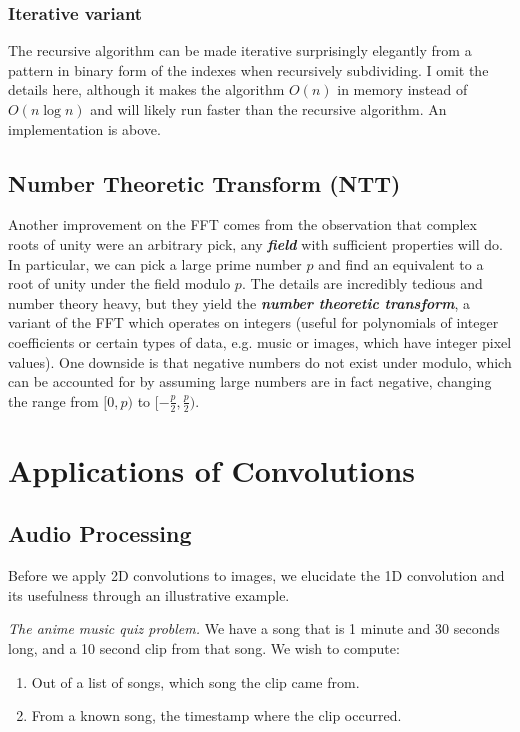 \documentclass[11pt, oneside]{article}
\newcommand{\emphasis}[1]{\textbf{\textit{#1}}}
\theoremstyle{plain}
\theoremstyle{definition}
\begin{document}
\subsubsection{Iterative variant}
The recursive algorithm can be made iterative surprisingly elegantly from a
pattern in binary form of the indexes when recursively subdividing.
I omit the details here, although it makes the algorithm \( O(n) \) in memory
instead of \( O(n \log n) \) and will likely run faster than the recursive 
algorithm. An implementation is above.

\subsection{Number Theoretic Transform (NTT)}
Another improvement on the FFT comes from the observation that complex
roots of unity were an arbitrary pick, any \emphasis{field} with sufficient
properties will do. In particular, we can pick a large prime number \( p \) 
and find an equivalent to a root of unity under the field modulo \( p \).
The details are incredibly tedious and number theory heavy, but they yield
the \emphasis{number theoretic transform}, a variant of the FFT which operates
on integers (useful for polynomials of integer coefficients or certain types of
data, e.g. music or images, which have integer pixel values).
One downside is that negative numbers do not exist under modulo, which can
be accounted for by assuming large numbers are in fact negative,
changing the range from \( [0, p) \) to \( [-\frac{p}{2}, \frac{p}{2}) \).

\section{Applications of Convolutions}
\subsection{Audio Processing}
Before we apply 2D convolutions to images, we elucidate the 1D convolution
and its usefulness through an illustrative example.
\begin{displayquote}
\textit{The anime music quiz problem.} We have a song that is 1 minute and
30 seconds long, and a 10 second clip from that song. We wish to compute:
\begin{enumerate}
  \item Out of a list of songs, which song the clip came from.
  \item From a known song, the timestamp where the clip occurred.
\end{enumerate}
\end{displayquote}
\end{document}
